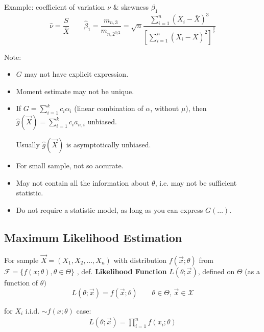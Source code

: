     Example: coefficient of variation $ \nu $ \& skewness $ \beta _1 $
    \begin{equation}\hat{\nu}=\dfrac{S}{\bar{X}}\qquad\hat{\beta}_1=\dfrac{m_{n,3}}{m_{n,2^{3/2}}}=\sqrt{n}{\displaystyle\frac{\displaystyle{\sum_{i=1}^n(X_i-\bar{X})^3}}{\displaystyle{\left[\sum_{i=1}^n(X_i-\bar{X})^2\right]^{\frac{3}{2}}}  }}\end{equation}

    \begin{point}
        Note:
    \end{point}
    
        
    \begin{itemize}
        \item $G$ may not have explicit expression.
        \item Moment estimate may not be unique.
        \item If $G={\displaystyle\sum_{i=1}^kc_i\alpha_i}$ (linear combination of $\alpha$, without $\mu$), then $\hat{g}(\vec{X})={\displaystyle\sum_{i=1}^kc_ia_{n,i}}$ unbiased.
        
        \qquad Usually $\hat{g}(\vec{X})$ is asymptotically unbiased.
        \item For small sample, not so accurate.
        \item May not contain all the information about $\theta$, i.e. may not be sufficient statistic.
        \item Do not require a statistic model, as long as you can express $ G(\ldots) $.
    \end{itemize}


\subsection{Maximum Likelihood Estimation}\label{SubSectionMLE}
    For sample $\vec{X}=(X_1,X_2,\ldots,X_n)$ with distribution $f(\vec{x};\theta)$ from $\mathscr{F}=\{f(x;\theta),\theta\in\Theta\}$ , def. \textbf{Likelihood Function} $L(\theta;\vec{x})$, defined on $\Theta$ (as a function of $\theta)$
    \begin{equation}
        L(\theta;\vec{x})=f(\vec{x};\theta)\qquad \theta\in\Theta,\,\vec{x}\in\mathscr{X}    
    \end{equation}

    for $ X_i $ i.i.d. $ \sim f(x;\theta ) $ case:
    \begin{align}
        L(\theta ;\vec{x})=\prod_{i=1}^nf (x_i;\theta )
    \end{align}
    
